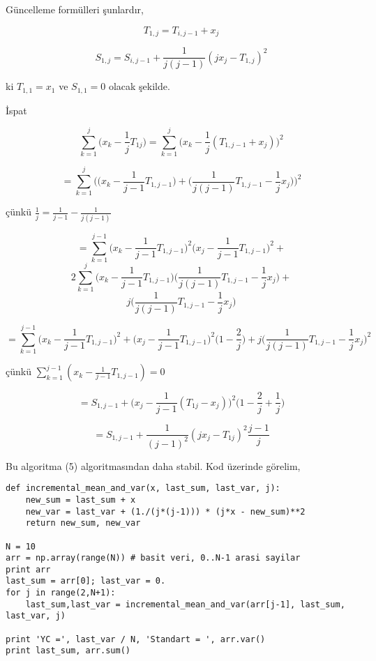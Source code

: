 \documentclass[12pt,fleqn]{article}\usepackage{../../common}
\begin{document}
Güncelleme formülleri şunlardır, 

$$ T_{1,j} = T_{i,j-1} + x_j$$

$$ S_{1,j} = S_{i,j-1} + \frac{1}{j(j-1)} (jx_j - T_{1,j})^2  $$

ki $T_{1,1} = x_1$ ve $S_{1,1}=0$ olacak şekilde.

İspat

$$ 
\sum_{k=1}^{j} \bigg( x_k - \frac{1}{j} T_{1j} \bigg) = 
\sum_{k=1}^{j} \bigg( x_k - \frac{1}{j} (T_{1,j-1}+x_j)  \bigg)^2
$$

$$ = \sum_{k=1}^{j} \bigg(
\bigg(x_k - \frac{1}{j-1}T_{1,j-1} \bigg) + 
\bigg( \frac{1}{j(j-1)} T_{1,j-1} - \frac{1}{j} x_j\bigg) 
\bigg)^2
$$

çünkü $\frac{1}{j} = \frac{1}{j-1}-\frac{1}{j(j-1)}$


$$
= \sum_{k=1}^{j-1} \bigg( x_k - \frac{1}{j-1} T_{1,j-1} \bigg)^2  
 \bigg( x_j - \frac{1}{j-1} T_{1,j-1} \bigg)^2 +
$$
$$
2 \sum_{k=1}^{j}  \bigg( x_k - \frac{1}{j-1} T_{1,j-1} \bigg)
\bigg( \frac{1}{j(j-1)} T_{1,j-1} - \frac{1}{j} x_j \bigg) +
$$
$$
j \bigg( \frac{1}{j(j-1)} T_{1,j-1} - \frac{1}{j} x_j \bigg) 
$$

$$ 
= \sum_{k=1}^{j-1} \bigg( x_k - \frac{1}{j-1} T_{1,j-1} \bigg)^2 + 
\bigg( x_j - \frac{1}{j-1} T_{1,j-1} \bigg)^2 \bigg( 1-\frac{2}{j} \bigg) + 
j \bigg( \frac{1}{j(j-1)} T_{1,j-1} - \frac{1}{j}x_j \bigg)^2
$$

çünkü $\sum_{k=1}^{j-1} (x_k-\frac{1}{j-1} T_{1,j-1} )=0$

$$ 
= S_{1,j-1}  + \bigg( x_j - \frac{1}{j-1} (T_{1j}-x_j) \bigg) ^2
\bigg( 1-\frac{2}{j}+\frac{1}{j}\bigg)
$$

$$ = S_{1,j-1} + \frac{1}{(j-1)^2} (jx_j - T_{1j})^2 \frac{j-1}{j} $$

Bu algoritma (5) algoritmasından daha stabil. Kod üzerinde görelim,

\begin{verbatim}
def incremental_mean_and_var(x, last_sum, last_var, j):
    new_sum = last_sum + x
    new_var = last_var + (1./(j*(j-1))) * (j*x - new_sum)**2 
    return new_sum, new_var

N = 10
arr = np.array(range(N)) # basit veri, 0..N-1 arasi sayilar
print arr
last_sum = arr[0]; last_var = 0.
for j in range(2,N+1):
    last_sum,last_var = incremental_mean_and_var(arr[j-1], last_sum, last_var, j)

print 'YC =', last_var / N, 'Standart = ', arr.var()
print last_sum, arr.sum()
\end{verbatim}
\end{document}
